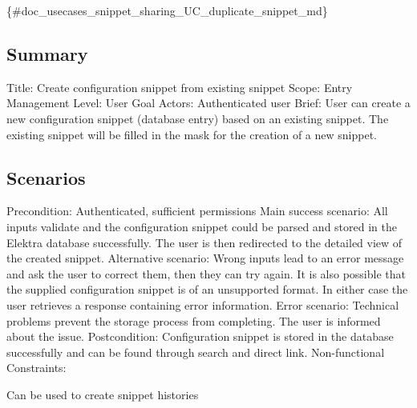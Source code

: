 \{\#doc\+\_\+usecases\+\_\+snippet\+\_\+sharing\+\_\+\+U\+C\+\_\+duplicate\+\_\+snippet\+\_\+md\}

\subsection*{Summary}

Title\+: Create configuration snippet from existing snippet Scope\+: Entry Management Level\+: User Goal Actors\+: Authenticated user Brief\+: User can create a new configuration snippet (database entry) based on an existing snippet. The existing snippet will be filled in the mask for the creation of a new snippet.

\subsection*{Scenarios}

Precondition\+: Authenticated, sufficient permissions Main success scenario\+: All inputs validate and the configuration snippet could be parsed and stored in the Elektra database successfully. The user is then redirected to the detailed view of the created snippet. Alternative scenario\+: Wrong inputs lead to an error message and ask the user to correct them, then they can try again. It is also possible that the supplied configuration snippet is of an unsupported format. In either case the user retrieves a response containing error information. Error scenario\+: Technical problems prevent the storage process from completing. The user is informed about the issue. Postcondition\+: Configuration snippet is stored in the database successfully and can be found through search and direct link. Non-\/functional Constraints\+:
\begin{DoxyItemize}
\item Can be used to create snippet histories 
\end{DoxyItemize}